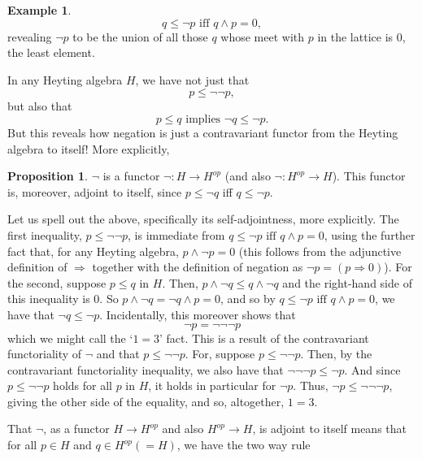 \documentclass[a4paper]{book}
\theoremstyle{definition}
\newtheorem{example}{Example}[section]
\theoremstyle{definition}
\theoremstyle{definition}
\newtheorem{proposition}{Proposition}[section]
\theoremstyle{theorem}
\theoremstyle{definition}
\begin{document}
\begin{example}
	\begin{equation*}
	q \leq \neg p \text{ iff } q \wedge p = 0,
	\end{equation*}
	revealing $\neg p$ to be the union of all those $q$ whose meet with $p$ in the lattice is $0$, the least element. \par 
	In any Heyting algebra $H$, we have not just that 
	\begin{equation*}
	p \leq \neg \neg p,
	\end{equation*}
	but also that 
	\begin{equation*}
	p \leq q \text{ implies } \neg q \leq \neg p.
	\end{equation*} 
	But this reveals how negation is just a contravariant functor from the Heyting algebra to itself! More explicitly, 
	\begin{proposition} 
		$\neg$ is a functor $\neg: H \rightarrow H^{op}$ (and also $\neg: H^{op} \rightarrow H$). This functor is, moreover, adjoint to itself, since $p \leq \neg q$ iff $q \leq \neg p$. 
	\end{proposition} \noindent 
Let us spell out the above, specifically its self-adjointness, more explicitly. The first inequality, $p \leq \neg \neg p$, is immediate from $q \leq \neg p \text{ iff } q \wedge p = 0$, using the further fact that, for any Heyting algebra, $p \wedge \neg p = 0$ (this follows from the adjunctive definition of $\Rightarrow$ together with the definition of negation as $\neg p = (p \Rightarrow 0)$). For the second, suppose $p \leq q$ in $H$. Then, $p \wedge \neg q \leq q \wedge \neg q$ and the right-hand side of this inequality is $0$. So $p \wedge \neg q = \neg q \wedge p = 0$, and so by $q \leq \neg p \text{ iff } q \wedge p = 0$, we have that $\neg q \leq \neg p$. Incidentally, this moreover shows that
	\begin{equation*}
	\neg p = \neg \neg \neg p
	\end{equation*} which we might call the `$1 = 3$' fact. This is a result of the contravariant functoriality of $\neg$ and that $p \leq \neg \neg p$. For, suppose $p \leq \neg \neg p$. Then, by the contravariant functoriality inequality, we also have that $\neg \neg \neg p \leq \neg p$. And since $p \leq \neg \neg p$ holds for all $p$ in $H$, it holds in particular for $\neg p$. Thus, $\neg p \leq \neg \neg \neg p$, giving the other side of the equality, and so, altogether, $1 = 3$. \par 
	That $\neg$, as a functor $H \rightarrow H^{op}$ and also $H^{op} \rightarrow H$, is adjoint to itself means that for all $p \in H$ and $q \in H^{op} (= H)$, we have the two way rule 

\end{example}
\end{document}
